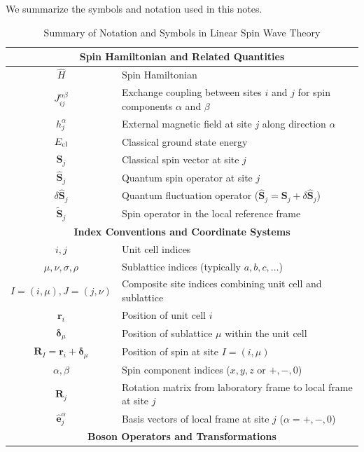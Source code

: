 \documentclass[aps, prx, nofootinbib, superscriptaddress]{revtex4-2}
\begin{document}
We summarize the symbols and notation used in this notes.
\begin{table}[t]
    \centering
    \caption{Summary of Notation and Symbols in Linear Spin Wave Theory}
    \begin{tabular}{c|l}
    \multicolumn{2}{c}{\textbf{Spin Hamiltonian and Related Quantities}} \\
    \hline
    $\hat{H}$ & Spin Hamiltonian \\
    $J_{ij}^{\alpha\beta}$ & Exchange coupling between sites $i$ and $j$ for spin components $\alpha$ and $\beta$ \\
    $h_j^{\alpha}$ & External magnetic field at site $j$ along direction $\alpha$ \\
    $E_{\rm cl}$ & Classical ground state energy \\
    $\mathbf{S}_j$ & Classical spin vector at site $j$ \\
    $\hat{\mathbf{S}}_j$ & Quantum spin operator at site $j$ \\
    $\delta\hat{\mathbf{S}}_j$ & Quantum fluctuation operator ($\hat{\mathbf{S}}_j = \mathbf{S}_j + \delta\hat{\mathbf{S}}_j$) \\
    $\widetilde{\mathbf{S}}_j$ & Spin operator in the local reference frame \\
    \hline
    \multicolumn{2}{c}{\textbf{Index Conventions and Coordinate Systems}} \\
    \hline
    $i, j$ & Unit cell indices \\
    $\mu, \nu, \sigma, \rho$ & Sublattice indices (typically $a, b, c, \dots$) \\
    $I = (i, \mu), J = (j, \nu)$ & Composite site indices combining unit cell and sublattice \\
    $\mathbf{r}_i$ & Position of unit cell $i$ \\
    $\boldsymbol{\delta}_\mu$ & Position of sublattice $\mu$ within the unit cell \\
    $\mathbf{R}_I = \mathbf{r}_i + \boldsymbol{\delta}_\mu$ & Position of spin at site $I = (i, \mu)$ \\
    $\alpha, \beta$ & Spin component indices ($x, y, z$ or $+, -, 0$) \\
    $\mathbf{R}_j$ & Rotation matrix from laboratory frame to local frame at site $j$ \\
    $\hat{\mathbf{e}}_j^{\alpha}$ & Basis vectors of local frame at site $j$ ($\alpha = +, -, 0$) \\
    \hline
    \multicolumn{2}{c}{\textbf{Boson Operators and Transformations}} \\

\end{tabular}
\end{table}
\end{document}
